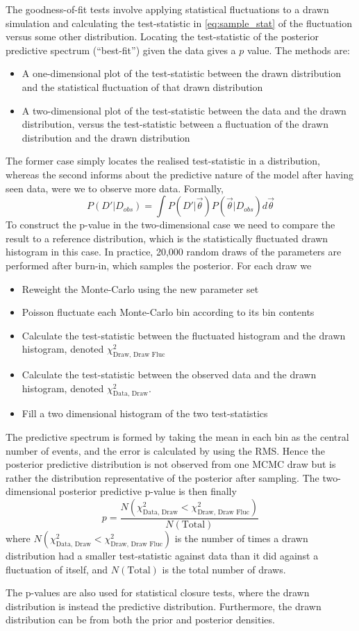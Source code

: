 The goodness-of-fit tests involve applying statistical fluctuations to a drawn simulation and calculating the test-statistic in \autoref{eq:sample_stat} of the fluctuation versus some other distribution. Locating the test-statistic of the posterior predictive spectrum (``best-fit'') given the data gives a $p$ value. The methods are:
\begin{itemize} 
	\item A one-dimensional plot of the test-statistic between the drawn distribution and the statistical fluctuation of that drawn distribution
	\item A two-dimensional plot of the test-statistic between the data and the drawn distribution, versus the test-statistic between a fluctuation of the drawn distribution and the drawn distribution
\end{itemize}
The former case simply locates the realised test-statistic in a distribution, whereas the second informs about the predictive nature of the model after having seen data, were we to observe more data. Formally,
\begin{equation}
P(D'|D_{obs}) = \int P(D'|\vec{\theta}) P(\vec{\theta}|D_{obs}) d\vec{\theta}
\end{equation}
To construct the p-value in the two-dimensional case we need to compare the result to a reference distribution, which is the statistically fluctuated drawn histogram in this case. In practice, 20,000 random draws of the parameters are performed after burn-in, which samples the posterior. For each draw we
\begin{itemize}
	\item Reweight the Monte-Carlo using the new parameter set
	\item Poisson fluctuate each Monte-Carlo bin according to its bin contents
	\item Calculate the test-statistic between the fluctuated histogram and the drawn histogram, denoted $\chi^2_{\text{Draw, Draw Fluc}}$
	\item Calculate the test-statistic between the observed data and the drawn histogram, denoted $\chi^2_{\text{Data, Draw}}$.
	\item Fill a two dimensional histogram of the two test-statistics
\end{itemize}
The predictive spectrum is formed by taking the mean in each bin as the central number of events, and the error is calculated by using the RMS. Hence the posterior predictive distribution is not observed from one MCMC draw but is rather the distribution representative of the posterior after sampling. The two-dimensional posterior predictive p-value is then finally
\begin{equation}
p = \frac{N\left(\chi^2_{\text{Data, Draw}} < \chi^2_{\text{Draw, Draw Fluc}}\right)}{N\left(\text{Total}\right)}
\end{equation}
where $N\left(\chi^2_{\text{Data, Draw}} < \chi^2_{\text{Draw, Draw Fluc}}\right)$ is the number of times a drawn distribution had a smaller test-statistic against data than it did against a fluctuation of itself, and $N(\text{Total})$ is the total number of draws.

The p-values are also used for statistical closure tests, where the drawn distribution is instead the predictive distribution. Furthermore, the drawn distribution can be from both the prior and posterior densities.